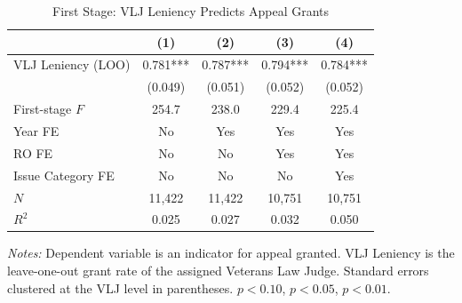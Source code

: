 
\begin{table}[H]
\centering
\caption{First Stage: VLJ Leniency Predicts Appeal Grants}
\begin{threeparttable}
\begin{tabular}{lcccc}
\toprule
& (1) & (2) & (3) & (4) \\
\midrule
VLJ Leniency (LOO) & 0.781*** & 0.787*** & 0.794*** & 0.784*** \\
                    & (0.049) & (0.051) & (0.052) & (0.052) \\[0.5em]
First-stage $F$     & 254.7 & 238.0 & 229.4 & 225.4 \\
\midrule
Year FE             & No & Yes & Yes & Yes \\
RO FE               & No & No & Yes & Yes \\
Issue Category FE   & No & No & No & Yes \\
\midrule
$N$                 & 11,422 & 11,422 & 10,751 & 10,751 \\
$R^2$               & 0.025 & 0.027 & 0.032 & 0.050 \\
\bottomrule
\end{tabular}
\begin{tablenotes}[flushleft]
\small
\item \textit{Notes:} Dependent variable is an indicator for appeal granted. VLJ Leniency is the leave-one-out grant rate of the assigned Veterans Law Judge. Standard errors clustered at the VLJ level in parentheses. \sym{*} $p<0.10$, \sym{**} $p<0.05$, \sym{***} $p<0.01$.
\end{tablenotes}
\end{threeparttable}
\label{tab:first_stage}
\end{table}
